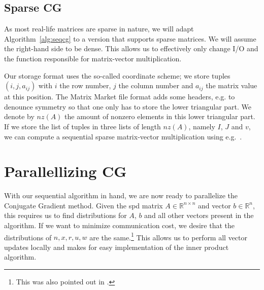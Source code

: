 \documentclass[11pt]{amsart}
\theoremstyle{definition}
\newcommand{\R}{\mathbb{R}}
\begin{document}
\subsection{Sparse CG}
As most real-life matrices are sparse in nature, we will adapt Algorithm~\ref{alg:seqcg} to a version that supports sparse matrices. We will assume the right-hand side to be dense. This allows us to effectively only change I/O and the function responsible for matrix-vector multiplication.

Our storage format uses the so-called coordinate scheme; we store tuples $(i, j, a_{ij})$ with $i$ the row number, $j$ the column number and $a_{ij}$ the matrix value at this position. The Matrix Market file format adds some headers, e.g. to denounce symmetry so that one only has to store the lower triangular part. We denote by $nz(A)$ the amount of nonzero elements in this lower triangular part. If we store the list of tuples in three lists of length $nz(A)$, namely $I$, $J$ and $v$, we can compute a sequential sparse matrix-vector multiplication using e.g.~\cite[Alg.~4.3]{biss04}.

\section{Parallellizing CG}
\label{sec:parcg}
With our sequential algorithm in hand, we are now ready to parallelize the Conjugate Gradient method. Given the spd matrix $A \in \R^{n \times n}$ and vector $b \in \R^n$, this requires us to find distributions for $A$, $b$ and all other vectors present in the algorithm. If we want to minimize communication cost, we desire that the distributions of $n, x, r, u, w$ are the same.\footnote{This was also pointed out in \cite[p.~174]{biss04}.} This allows us to perform all vector updates locally and makes for easy implementation of the inner product algorithm.
\end{document}
